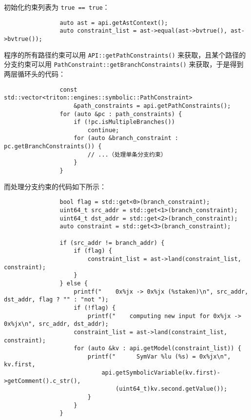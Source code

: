 \documentclass{ctexbeamer}
\begin{document}
    \begin{frame}[fragile]
    
        初始化约束列表为 \texttt{true == true}：

        {
            \small
            \begin{verbatim}
                auto ast = api.getAstContext();
                auto constraint_list = ast->equal(ast->bvtrue(), ast->bvtrue());
            \end{verbatim}
        }
        \pause 程序的所有路径约束可以用 \texttt{API::getPathConstraints()} 来获取，且某个路径的分支约束可以用 \texttt{PathConstraint::getBranchConstraints()} 来获取，于是得到两层循环头的代码：

        {
            \small
            \begin{verbatim}
                const std::vector<triton::engines::symbolic::PathConstraint>
                    &path_constraints = api.getPathConstraints();
                for (auto &pc : path_constraints) {
                    if (!pc.isMultipleBranches())
                        continue;
                    for (auto &branch_constraint : pc.getBranchConstraints()) {
                        // ...（处理单条分支约束）
                    }
                }
            \end{verbatim}
        }
    
    \end{frame}

    \begin{frame}[fragile]
    
        而处理分支约束的代码如下所示：

        {
            \scriptsize
            \begin{verbatim}
                bool flag = std::get<0>(branch_constraint);
                uint64_t src_addr = std::get<1>(branch_constraint);
                uint64_t dst_addr = std::get<2>(branch_constraint);
                auto constraint = std::get<3>(branch_constraint);

                if (src_addr != branch_addr) {
                    if (flag) {
                        constraint_list = ast->land(constraint_list, constraint);
                    }
                } else {
                    printf("    0x%jx -> 0x%jx (%staken)\n", src_addr, dst_addr, flag ? "" : "not ");
                    if (!flag) {
                        printf("    computing new input for 0x%jx -> 0x%jx\n", src_addr, dst_addr);
                    constraint_list = ast->land(constraint_list, constraint);
                    for (auto &kv : api.getModel(constraint_list)) {
                        printf("      SymVar %lu (%s) = 0x%jx\n", kv.first,
                            api.getSymbolicVariable(kv.first)->getComment().c_str(),
                                (uint64_t)kv.second.getValue());
                        }
                    }
                }
            \end{verbatim}
        }
    
    \end{frame}
\end{document}
